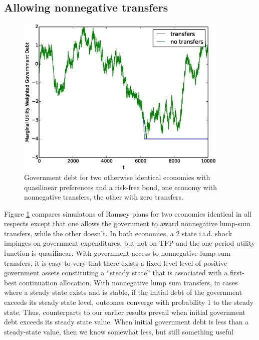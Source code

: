 \documentclass[12pt]{article}
\newcommand{\tjs}[1]{\textcolor{red}{$^{\textrm{tjs}}${#1}}}
\begin{document}
\subsection{Allowing nonnegative transfers}
\begin{figure}[h]
	\begin{center}
	\includegraphics[width=4in]{Images/transfer_example2.eps}
\caption{Government  debt for two otherwise identical economies with quasilinear preferences and a risk-free bond, one economy   with nonnegative transfers, the other with zero transfers.\label{fig:nonnegative_transfers}}
	\end{center}
\end{figure}
	Figure \ref{fig:nonnegative_transfers} compares simulatons of Ramsey plans for two economies identical in all respects except that one allows the government to award nonnegative lump-sum 
	transfers, while the other doesn't.  
	In both economies, a 2 state i.i.d. shock impinges on  government expenditures, but not on TFP and the one-period utility function is  quasilinear.
	With government access to nonnegative lump-sum transfers, it is easy to very that  there exists  
	a fixed level  level of positive government assets constituting a  ``steady state'' that is associated with a first-best continuation allocation.
	With nonnegative lump sum transfers,  in cases where a steady state exists and is stable,  if the initial debt of the government exceeds its steady state level, 
	outcomes   converge with probability 1 to the steady state. Thus, counterparts to our earlier results prevail  when
initial government debt exceeds its steady state value.  When initial government debt is less than a steady-state value, then we know  somewhat  less, but still something useful
\end{document}
